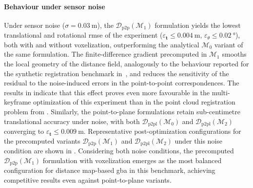 \paragraph{Behaviour under sensor noise}
Under sensor noise ($\sigma = \SI{0.03}{\metre}$), the
$\mathcal{D}_{\mathrm{p2p}}(\mathcal{M}_1)$ formulation yields the
lowest translational and rotational \gls{rmse} of the experiment
($\varepsilon_{\mathbf{t}} \leq \SI{0.004}{\metre}$,
$\varepsilon_{\theta} \leq \SI{0.02}{\degree}$), both with and
without voxelization, outperforming the analytical $\mathcal{M}_0$
variant of the same formulation. The finite-difference gradient
precomputed in $\mathcal{M}_1$ smooths the local geometry of the
distance field, analogously to the behaviour reported for the
synthetic registration benchmark
in~, and
reduces the sensitivity of the residual to the noise-induced errors
in the point-to-point correspondences. The results in
 indicate that this effect proves even
more favourable in the multi-keyframe optimization of this
experiment than in the point cloud registration problem from
. Similarly, the point-to-plane formulations
retain sub-centimetre translational accuracy under noise,
with both $\mathcal{D}_{\mathrm{p2pl}}(\mathcal{M}_0)$ and
$\mathcal{D}_{\mathrm{p2pl}}(\mathcal{M}_2)$ converging to
$\varepsilon_{\mathbf{t}} \leq \SI{0.009}{\metre}$. Representative
post-optimization configurations for the precomputed variants
$\mathcal{D}_{\mathrm{p2p}}(\mathcal{M}_1)$ and
$\mathcal{D}_{\mathrm{p2pl}}(\mathcal{M}_2)$ under this noise
condition are shown in
.
Considering both noise conditions, the precomputed
$\mathcal{D}_{\mathrm{p2p}}(\mathcal{M}_1)$ formulation with
voxelization emerges as the most balanced configuration for distance
map-based \gls{gba} in this benchmark, achieving competitive results even
against point-to-plane variants.

